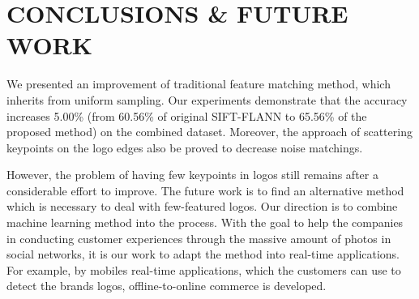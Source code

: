 \documentclass[letterpaper, 10 pt, conference]{ieeeconf}  %
\begin{document}
\section{CONCLUSIONS \& FUTURE WORK}
We presented an improvement of traditional feature matching method, which inherits from uniform sampling. Our experiments demonstrate that the accuracy increases 5.00\% (from 60.56\% of original SIFT-FLANN to 65.56\% of the proposed method) on the combined dataset. Moreover, the approach of scattering keypoints on the logo edges also be proved to decrease noise matchings.\par
However, the problem of having few keypoints in logos still remains after a considerable effort to improve. The future work is to find an alternative method which is necessary to deal with few-featured logos. Our direction is to combine machine learning method into the process. With the goal to help the companies in conducting customer experiences through the massive amount of photos in social networks, it is our work to adapt the method into real-time applications. For example, by mobiles real-time applications, which the customers can use to detect the brands logos, offline-to-online commerce is developed.
\end{document}
